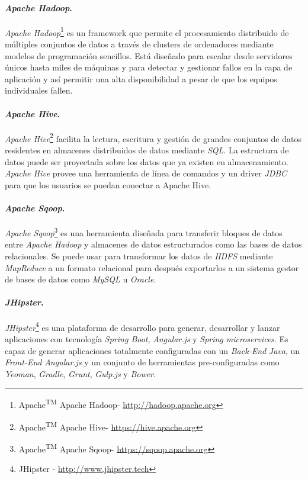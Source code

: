 \paragraph*{\textit{Apache Hadoop}.} \textit{Apache Hadoop}\footnote{Apache\textsuperscript{TM} Apache Hadoop\textregistered - \url{http://hadoop.apache.org}} es un framework que permite el procesamiento distribuido de múltiples conjuntos de datos a través de clusters de ordenadores mediante modelos de programación sencillos. Está diseñado para escalar desde servidores únicos hasta miles de máquinas y para detectar y gestionar fallos en la capa de aplicación y así permitir una alta disponibilidad a pesar de que los equipos individuales fallen. 
\paragraph*{\textit{Apache Hive}.} \textit{Apache Hive}\footnote{Apache\textsuperscript{TM} Apache Hive\textregistered - \url{https://hive.apache.org}} facilita la lectura, escritura y gestión de grandes conjuntos de datos residentes en almacenes distribuidos de datos mediante \textit{SQL}. La estructura de datos puede ser proyectada sobre los datos que ya existen en almacenamiento. \textit{Apache Hive} provee una herramienta de línea de comandos y un driver \textit{JDBC} para que los usuarios se puedan conectar a Apache Hive. 
\paragraph*{ \textit{Apache Sqoop}.} \textit{Apache Sqoop}\footnote{Apache\textsuperscript{TM} Apache Sqoop\textregistered - \url{https://sqoop.apache.org}} es una herramienta diseñada para transferir bloques de datos entre \textit{Apache Hadoop} y almacenes de datos estructurados como las bases de datos relacionales. Se puede usar para transformar los datos de \textit{HDFS} mediante \textit{MapReduce} a un formato relacional para después exportarlos a un sistema gestor de bases de datos como \textit{MySQL} u \textit{Oracle}. 
\paragraph*{\textit{JHipster}.} \textit{JHipster}\footnote{JHipster - \url{http://www.jhipster.tech}} es una plataforma de desarrollo para generar, desarrollar y lanzar aplicaciones con tecnología \textit{Spring Boot}, \textit{Angular.js} y \textit{Spring microservices}. Es capaz de generar aplicaciones totalmente configuradas con un \textit{Back-End} \textit{Java}, un \textit{Front-End} \textit{Angular.js} y un conjunto de herramientas pre-configuradas como \textit{Yeoman}, \textit{Gradle}, \textit{Grunt}, \textit{Gulp.js} y \textit{Bower}.
